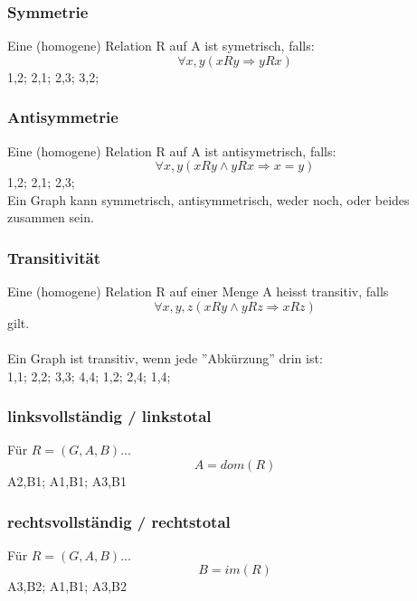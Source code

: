 \subsubsection{Symmetrie}
Eine (homogene) Relation R auf A ist symetrisch, falls:
\begin{equation}
    \forall{x,y} (xRy \Rightarrow yRx)
\end{equation}
{
1,2;
2,1;
2,3;
3,2;
}
\symetrisch{}
\subsubsection{Antisymmetrie}
Eine (homogene) Relation R auf A ist antisymetrisch, falls:
\begin{equation}
    \forall{x,y} (xRy \wedge yRx \Rightarrow x = y)
\end{equation}
{
1,2;
2,1;
2,3;
}
\antisymmetrisch{}
\\Ein Graph kann symmetrisch, antisymmetrisch, weder noch, oder beides zusammen sein.
\subsubsection{Transitivität} 
Eine (homogene) Relation R auf einer Menge A heisst transitiv,
falls
\begin{equation}
    \forall{x,y,z} (xRy \wedge yRz \Rightarrow xRz)
\end{equation}
gilt.\\\\
Ein Graph ist transitiv, wenn jede ''Abkürzung'' drin ist:\\
{
1,1;
2,2;
3,3;
4,4;
1,2;
2,4;
1,4;
}
\transitiv{}
\subsubsection{linksvollständig / linkstotal}
Für  $R = (G,A,B)$...
    \begin{equation}
        A = dom(R)
    \end{equation}
    {
    A2,B1;
    A1,B1;
    A3,B1
    }
\linkstotal{}
\subsubsection{rechtsvollständig / rechtstotal}
Für  $R = (G,A,B)$...
    \begin{equation}
        B = im(R)
    \end{equation}
        {
        A3,B2;
        A1,B1;
        A3,B2
        }
    \rechtstotal{}
